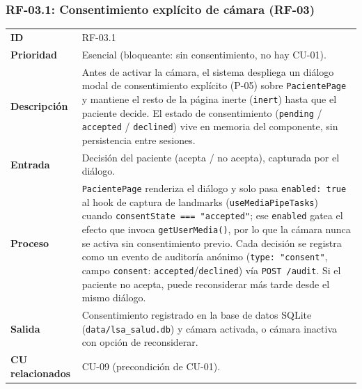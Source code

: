 \subsubsection{RF-03.1: Consentimiento explícito de cámara (RF-03)}
\begin{table}[H]
\centering
\begin{tabularx}{\textwidth}{l X}
\toprule
\textbf{ID} & RF-03.1 \\
\textbf{Prioridad} & Esencial (bloqueante: sin consentimiento, no hay CU-01). \\
\textbf{Descripción} & Antes de activar la cámara, el sistema despliega un diálogo modal de consentimiento explícito (P-05) sobre \texttt{PacientePage} y mantiene el resto de la página inerte (\texttt{inert}) hasta que el paciente decide. El estado de consentimiento (\texttt{pending} / \texttt{accepted} / \texttt{declined}) vive en memoria del componente, sin persistencia entre sesiones. \\
\textbf{Entrada} & Decisión del paciente (acepta / no acepta), capturada por el diálogo. \\
\textbf{Proceso} & \texttt{PacientePage} renderiza el diálogo y solo pasa \texttt{enabled: true} al hook de captura de landmarks (\texttt{useMediaPipeTasks}) cuando \texttt{consentState === "accepted"}; ese \texttt{enabled} gatea el efecto que invoca \texttt{getUserMedia()}, por lo que la cámara nunca se activa sin consentimiento previo. Cada decisión se registra como un evento de auditoría anónimo (\texttt{type: "consent"}, campo \texttt{consent}: \texttt{accepted}/\texttt{declined}) vía \texttt{POST /audit}. Si el paciente no acepta, puede reconsiderar más tarde desde el mismo diálogo. \\
\textbf{Salida} & Consentimiento registrado en la base de datos SQLite (\texttt{data/lsa\_salud.db}) y cámara activada, o cámara inactiva con opción de reconsiderar. \\
\textbf{CU relacionados} & CU-09 (precondición de CU-01). \\
\bottomrule
\end{tabularx}
\end{table}

